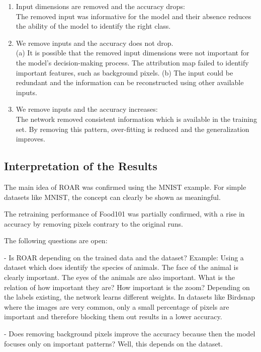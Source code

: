 \begin{enumerate}
	\item Input dimensions are removed and the accuracy drops:\\ The removed input was informative for the model and
	their absence reduces the ability of the model to identify the right class.
	
	\item We remove inputs and the accuracy does not drop.\\ (a) It is possible that the removed input dimensions	were not important for the model’s decision-making	process. The attribution map failed to identify important features, such as background pixels. (b) The input could be redundant and the information can be reconstructed using other available inputs. 
	
	\item We remove inputs and the accuracy increases:\\ The network removed consistent information which is available in the training set. By removing this pattern, over-fitting is reduced and the generalization improves.
\end{enumerate}


\subsection{Interpretation of the Results}

The main idea of ROAR was confirmed using the MNIST example. For simple datasets like MNIST, the concept can clearly be shown as meaningful.

The retraining performance of Food101 was partially confirmed, with a rise in accuracy by removing pixels contrary to the original runs.

The following questions are open:

- Is ROAR depending on the trained data and the dataset? Example: Using a dataset which does identify the species of animals. The face of the animal is clearly important. The eyes of the animals are also important. What is the relation of how important they are? How important is the zoom? Depending on the labels existing, the network learns different weights. In datasets like Birdsnap where the images are very common, only a small percentage of pixels are important and therefore blocking them out results in a lower accuracy.


- Does removing background pixels improve the accuracy because then the model focuses only on important patterns?
Well, this depends on the dataset.

